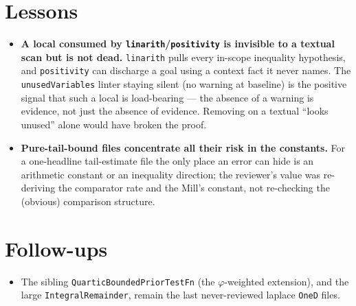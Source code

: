 \documentclass[11pt]{article}
\begin{document}
\section{Lessons}
\begin{itemize}[noitemsep]
  \item \textbf{A local consumed by \texttt{linarith}/\texttt{positivity} is invisible to a textual
    scan but is not dead.} \texttt{linarith} pulls every in-scope inequality hypothesis, and
    \texttt{positivity} can discharge a goal using a context fact it never names. The
    \texttt{unusedVariables} linter staying silent (no warning at baseline) is the positive signal
    that such a local is load-bearing --- the absence of a warning is evidence, not just the absence of
    evidence. Removing on a textual ``looks unused'' alone would have broken the proof.
  \item \textbf{Pure-tail-bound files concentrate all their risk in the constants.} For a
    one-headline tail-estimate file the only place an error can hide is an arithmetic constant or an
    inequality direction; the reviewer's value was re-deriving the comparator rate and the Mill's
    constant, not re-checking the (obvious) comparison structure.
\end{itemize}

\section{Follow-ups}
\begin{itemize}[noitemsep]
  \item The sibling \texttt{QuarticBoundedPriorTestFn} (the $\varphi$-weighted extension), and the
    large \texttt{IntegralRemainder}, remain the last never-reviewed laplace \texttt{OneD} files.
\end{itemize}
\end{document}
